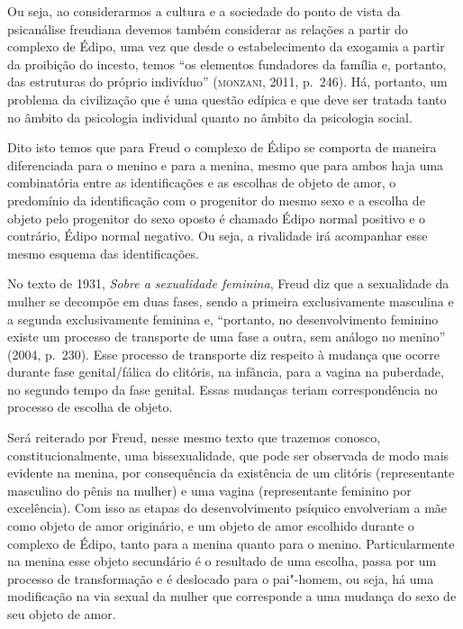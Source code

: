 Ou seja, ao considerarmos a cultura e a sociedade do ponto de vista da
psicanálise freudiana devemos também considerar as relações a partir do
complexo de Édipo, uma vez que desde o estabelecimento da exogamia a
partir da proibição do incesto, temos ``os elementos fundadores da
família e, portanto, das estruturas do próprio indivíduo'' (\textsc{monzani},
2011, p.~246). Há, portanto, um problema da civilização que é uma questão
edípica e que deve ser tratada tanto no âmbito da psicologia individual
quanto no âmbito da psicologia social.

Dito isto temos que para Freud o complexo de Édipo se comporta de
maneira diferenciada para o menino e para a menina, mesmo que para ambos
haja uma combinatória entre as identificações e as escolhas de objeto de
amor, o predomínio da identificação com o progenitor do mesmo sexo e a escolha de objeto pelo progenitor do sexo oposto é chamado Édipo normal positivo e o contrário, Édipo normal negativo. Ou seja, a rivalidade irá acompanhar esse mesmo esquema das identificações.  


No texto de 1931, \emph{Sobre a sexualidade feminina}, Freud diz que a
sexualidade da mulher se decompõe em duas fases, sendo a primeira
exclusivamente masculina e a segunda exclusivamente feminina e,
``portanto, no desenvolvimento feminino existe um processo de transporte
de uma fase a outra, sem análogo no menino'' (2004, p.~230).
Esse processo de transporte diz respeito à mudança que ocorre durante
fase genital/fálica do clitóris, na infância, para a vagina na puberdade,
no segundo tempo da fase genital. Essas mudanças teriam correspondência
no processo de escolha de objeto.

Será reiterado por Freud, nesse mesmo texto que trazemos conosco,
constitucionalmente, uma bissexualidade, que pode ser observada de modo
mais evidente na menina, por consequência da existência de um clitóris
(representante masculino do pênis na mulher) e uma vagina (representante
feminino por excelência). Com isso as etapas do desenvolvimento psíquico
envolveriam a mãe como objeto de amor originário, e um objeto de amor
escolhido durante o complexo de Édipo, tanto para a menina quanto para o
menino. Particularmente na menina esse objeto secundário é o resultado
de uma escolha, passa por um processo de transformação e é deslocado
para o pai"-homem, ou seja, há uma modificação na via sexual da mulher
que corresponde a uma mudança do sexo de seu objeto de amor.

